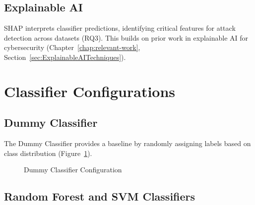 \subsection{Explainable AI}\label{subsec:ExplainableAI}

SHAP interprets classifier predictions, identifying critical features for attack detection across datasets (RQ3). This builds on prior work in explainable AI for cybersecurity (Chapter~\ref{chap:relevant-work}, Section~\ref{sec:ExplainableAITechniques}).

\section{Classifier Configurations}\label{sec:ClassifierConfigurations}

\subsection{Dummy Classifier}\label{subsec:DummyClassifier}

The Dummy Classifier provides a baseline by randomly assigning labels based on class distribution (Figure~\ref{fig:DummyClassifierConfig}).

\begin{figure}[H]
    \centering
    \caption{Dummy Classifier Configuration}\label{fig:DummyClassifierConfig}
\end{figure}

\subsection{Random Forest and SVM Classifiers}\label{subsec:RandomForest_SVMClassifier}

